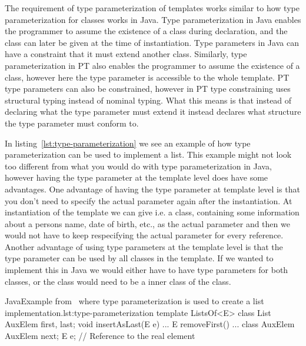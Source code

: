 
The requirement of type parameterization of templates works similar to how type parameterization for classes works in Java.
Type parameterization in Java enables the programmer to assume the existence of a class during declaration, and the class can later be given at the time of instantiation.
Type parameters in Java can have a constraint that it must extend another class.
Similarly, type parameterization in PT also enables the programmer to assume the existence of a class, however here the type parameter is accessible to the whole template.
PT type parameters can also be constrained, however in PT type constraining uses structural typing instead of nominal typing.
What this means is that instead of declaring what the type parameter must extend it instead declares what structure the type parameter must conform to.

In listing~\vref{lst:type-parameterization} we see an example of how type parameterization can be used to implement a list.
This example might not look too different from what you would do with type parameterization in Java, however having the type parameter at the template level does have some advantages.
One advantage of having the type parameter at template level is that you don't need to specify the actual parameter again after the instantiation.
At instantiation of the  template we can give i.e. a  class, containing some information about a persons name, date of birth, etc., as the actual parameter and then we would not have to keep respecifying the actual parameter for every reference.
Another advantage of using type parameters at the template level is that the type parameter can be used by all classes in the template.
If we wanted to implement this in Java we would either have to have type parameters for both classes, or the  class would need to be a inner class of the  class.

\begin{code}{Java}{Example from~\cite{jot} where type parameterization is used to create a list implementation.}{lst:type-parameterization}
    template ListsOf<E> {
        class List {
            AuxElem first, last;
            void insertAsLast(E e) { ... }
            E removeFirst() { ... }
        }
        class AuxElem {
            AuxElem next;
            E e; // Reference to the real element
        }
    }
\end{code}

